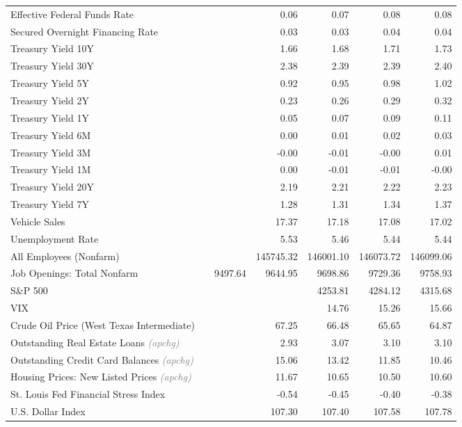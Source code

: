 \documentclass[11pt, letterpaper]{article}\usepackage[]{graphicx}\usepackage[]{color}
\begin{document}
\begin{table}[H]
\begin{tabular}{lrrrrrr}
  Effective Federal Funds Rate &  &  & 0.06 & 0.07 & 0.08 & 0.08 \\ 
  Secured Overnight Financing Rate &  &  & 0.03 & 0.03 & 0.04 & 0.04 \\ 
  Treasury Yield 10Y &  &  & 1.66 & 1.68 & 1.71 & 1.73 \\ 
  Treasury Yield 30Y &  &  & 2.38 & 2.39 & 2.39 & 2.40 \\ 
  Treasury Yield 5Y &  &  & 0.92 & 0.95 & 0.98 & 1.02 \\ 
  Treasury Yield 2Y &  &  & 0.23 & 0.26 & 0.29 & 0.32 \\ 
  Treasury Yield 1Y &  &  & 0.05 & 0.07 & 0.09 & 0.11 \\ 
  Treasury Yield 6M &  &  & 0.00 & 0.01 & 0.02 & 0.03 \\ 
  Treasury Yield 3M &  &  & -0.00 & -0.01 & -0.00 & 0.01 \\ 
  Treasury Yield 1M &  &  & 0.00 & -0.01 & -0.01 & -0.00 \\ 
  Treasury Yield 20Y &  &  & 2.19 & 2.21 & 2.22 & 2.23 \\ 
  Treasury Yield 7Y &  &  & 1.28 & 1.31 & 1.34 & 1.37 \\ 
  Vehicle Sales &  &  & 17.37 & 17.18 & 17.08 & 17.02 \\ 
  Unemployment Rate &  &  & 5.53 & 5.46 & 5.44 & 5.44 \\ 
  All Employees (Nonfarm) &  &  & 145745.32 & 146001.10 & 146073.72 & 146099.06 \\ 
  Job Openings: Total Nonfarm &  & 9497.64 & 9644.95 & 9698.86 & 9729.36 & 9758.93 \\ 
  S\&P 500 &  &  &  & 4253.81 & 4284.12 & 4315.68 \\ 
  VIX &  &  &  & 14.76 & 15.26 & 15.66 \\ 
  Crude Oil Price (West Texas Intermediate) &  &  & 67.25 & 66.48 & 65.65 & 64.87 \\ 
  Outstanding Real Estate Loans \textit{\footnotesize\textcolor{gray}{(apchg)}} &  &  & 2.93 & 3.07 & 3.10 & 3.10 \\ 
  Outstanding Credit Card Balances \textit{\footnotesize\textcolor{gray}{(apchg)}} &  &  & 15.06 & 13.42 & 11.85 & 10.46 \\ 
  Housing Prices: New Listed Prices \textit{\footnotesize\textcolor{gray}{(apchg)}} &  &  & 11.67 & 10.65 & 10.50 & 10.60 \\ 
  St. Louis Fed Financial Stress Index &  &  & -0.54 & -0.45 & -0.40 & -0.38 \\ 
  U.S. Dollar Index &  &  & 107.30 & 107.40 & 107.58 & 107.78 \\ 

\end{tabular}
\end{table}
\end{document}

